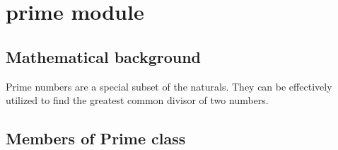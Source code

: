 \documentclass[letterpaper,10pt,english]{sphinxmanual}
\begin{document}
\section{prime module}
\label{\detokenize{prime:prime-module}}\label{\detokenize{prime::doc}}

\subsection{Mathematical background}
\label{\detokenize{prime:mathematical-background}}
Prime numbers are a special subset of the naturals.
They can be effectively utilized to find the greatest common divisor of two numbers.


\subsection{Members of Prime class}
\label{\detokenize{prime:module-prime}}\label{\detokenize{prime:members-of-prime-class}}
\end{document}
